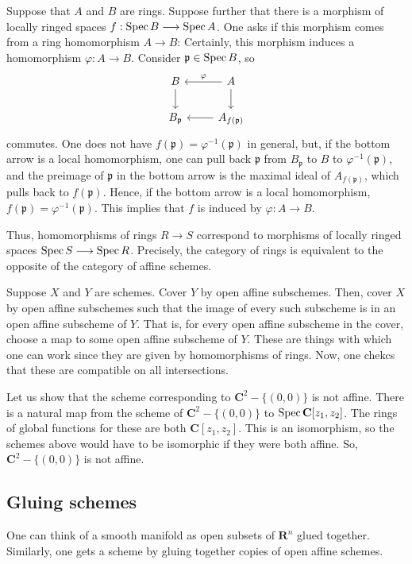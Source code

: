 \documentclass [11 pt, oneside] {article}
\begin{document}
Suppose that $A$ and $B$ are rings. Suppose further that there is a morphism of locally ringed spaces $f:\operatorname{Spec} B\longrightarrow \operatorname{Spec} A$. One asks if this morphism comes from a ring homomorphism $A\longrightarrow B$: Certainly, this morphism induces a homomorphism $\varphi : A\longrightarrow B$. Consider $\mathfrak{p}\in \operatorname{Spec} B$, so
\[
\begin{tikzcd}
	B \ar[d] & A \ar[l,"\varphi", swap] \ar[d] \\ B_{\mathfrak{p}} &A_{f(\mathfrak{p}) } \ar[l]
\end{tikzcd}
\]
commutes.
One does not have $f(\mathfrak{p}) = \varphi ^{-1}(\mathfrak{p})$ in general, but, if the bottom arrow is a local homomorphism, one can pull back $\mathfrak{p}$ from $B_{\mathfrak{p}}$ to $B$ to $\varphi^{-1}(\mathfrak{p})$, and the preimage of $\mathfrak{p}$ in the bottom arrow is the maximal ideal of $A_{f(\mathfrak{p}) }$, which pulls back to $f(\mathfrak{p})$. Hence, if the bottom arrow is a local homomorphism, $f(\mathfrak{p}) = \varphi^{-1}(\mathfrak{p})$. This implies that $f$ is induced by $\varphi : A\longrightarrow B$.

Thus, homomorphisms of rings $R\longrightarrow S$ correspond to morphisms of locally ringed spaces $\operatorname{Spec} S \longrightarrow \operatorname{Spec} R$. Precisely, the category of rings is equivalent to the opposite of the category of affine schemes.

Suppose $X$ and $Y$ are schemes. Cover $Y$ by open affine subschemes. Then, cover $X$ by open affine subschemes such that the image of every such subscheme is in an open affine subscheme of $Y$. That is, for every open affine subscheme in the cover, choose a map to some open affine subscheme of $Y$. These are things with which one can work since they are given by homomorphisms of rings. Now, one chekcs that these are compatible on all intersections.

\begin{example}[ ]\label{}\text{}
Let us show that the scheme corresponding to $\mathbf{C}^2 - \{(0,0)\}$ is not affine. There is a natural map from the scheme of $\mathbf{C}^2-\{(0,0)\}$ to $\operatorname{Spec} \mathbf{C}[z_1,z_2]$. The rings of global functions for these are both $\mathbf{C}[z_1,z_2]$. This is an isomorphism, so the schemes above would have to be isomorphic if they were both affine. So, $\mathbf{C}^2-\{(0,0)\}$ is not affine. 
\end{example}

\subsection{Gluing schemes}
One can think of a smooth manifold as open subsets of $\mathbf{R}^n$ glued together. Similarly, one gets a scheme by gluing together copies of open affine schemes.
\end{document}
